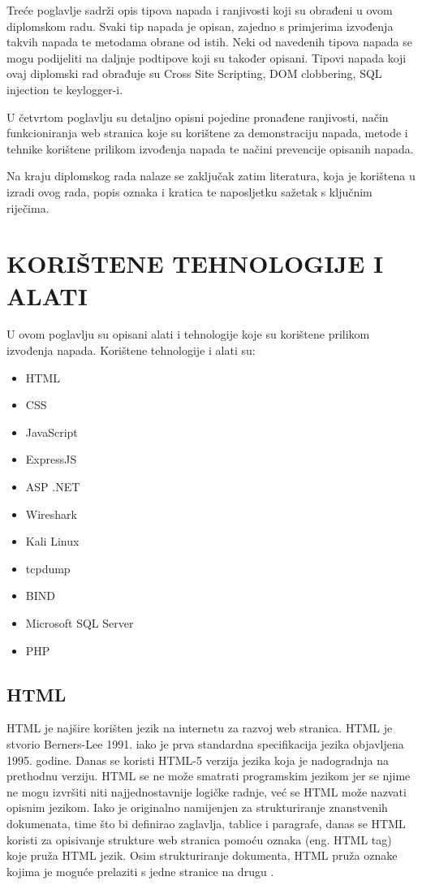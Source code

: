 \documentclass[12pt, oneside, onecolumn]{book}
\begin{document}
{Treće poglavlje sadrži opis tipova napada i ranjivosti koji su obrađeni u ovom diplomskom radu. Svaki tip napada je opisan, zajedno s primjerima izvođenja takvih napada te metodama obrane od istih. Neki od navedenih tipova napada se mogu podijeliti na daljnje podtipove koji su također opisani. Tipovi napada koji ovaj diplomski rad obrađuje su Cross Site Scripting, DOM clobbering, SQL injection te keylogger-i.

U četvrtom poglavlju su detaljno opisni pojedine pronađene ranjivosti, način funkcioniranja web stranica koje su korištene za demonstraciju napada, metode i tehnike korištene prilikom izvođenja napada te načini prevencije opisanih napada.

Na kraju diplomskog rada nalaze se zaključak zatim literatura, koja je korištena u izradi ovog rada, popis oznaka i kratica te naposljetku sažetak s ključnim riječima.

\chapter{KORIŠTENE TEHNOLOGIJE I ALATI}
U ovom poglavlju su opisani alati i tehnologije koje su korištene prilikom izvođenja napada. Korištene tehnologije i alati su: 

\begin{itemize}
\item HTML
\item CSS
\item JavaScript
\item ExpressJS
\item ASP .NET
\item Wireshark
\item Kali Linux
\item tcpdump
\item BIND
\item Microsoft SQL Server
\item PHP
\end{itemize}

\section{HTML}
HTML je najšire korišten jezik na internetu za razvoj web stranica. HTML je stvorio Berners-Lee 1991. iako je prva standardna specifikacija jezika objavljena 1995. godine.
Danas se koristi HTML-5 verzija jezika koja je nadogradnja na prethodnu verziju. HTML se ne može smatrati programskim jezikom jer se njime ne mogu izvršiti niti najjednostavnije logičke radnje, već se HTML može nazvati opisnim jezikom. Iako je originalno namijenjen za strukturiranje znanstvenih dokumenata, time što bi definirao zaglavlja, tablice i paragrafe, danas se HTML koristi za opisivanje strukture web stranica pomoću oznaka (eng. HTML tag) koje pruža HTML jezik. Osim strukturiranje dokumenta, HTML pruža oznake kojima je moguće prelaziti s jedne stranice na drugu \cite{html}.

}
\end{document}
